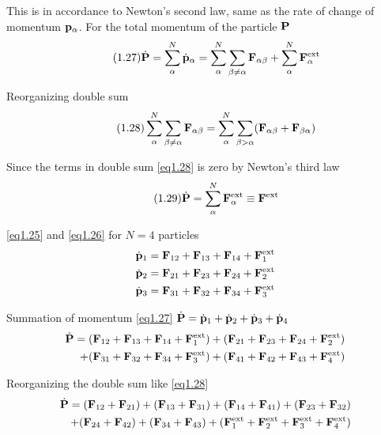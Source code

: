 \documentclass[../problems.tex]{subfiles}
\begin{document}
This is in accordance to Newton's second law, same as the rate of change of momentum 
$\mathbf{p}_\alpha$. For the total momentum of the particle $\mathbf{P}$
\begin{equation} \tag{1.27} \label{eq1.27}
    \dot{\mathbf{P}} = \sum_{\alpha}^N \dot{\mathbf{p}}_\alpha =
    \sum_{\alpha}^N \sum_{\beta \neq \alpha} \mathbf{F}_{\alpha \beta} + 
    \sum_{\alpha}^N \mathbf{F}_{\alpha}^\text{ext}
\end{equation}

Reorganizing double sum
\begin{equation} \tag{1.28} \label{eq1.28}
    \sum_{\alpha}^N \sum_{\beta \neq \alpha} \mathbf{F}_{\alpha \beta} 
    = \sum_{\alpha}^N \sum_{\beta > \alpha} (\mathbf{F}_{\alpha \beta} + \mathbf{F}_{\beta \alpha}) 
\end{equation}
    
Since the terms in double sum \eqref{eq1.28} is zero by Newton's third law
\begin{equation} \tag{1.29} \label{eq1.29}
    \dot{\mathbf{P}} = \sum_{\alpha}^N \mathbf{F}_{\alpha}^\text{ext} \equiv \mathbf{F}^\text{ext}
\end{equation}

\newpage
\eqref{eq1.25} and \eqref{eq1.26} for $N=4$ particles
\begin{align*}
    \dot{\mathbf{p}}_1 &= \mathbf{F}_{12} + \mathbf{F}_{13} + \mathbf{F}_{14} + \mathbf{F}_{1}^\text{ext} \\
    \dot{\mathbf{p}}_2 &= \mathbf{F}_{21} + \mathbf{F}_{23} + \mathbf{F}_{24} + \mathbf{F}_{2}^\text{ext} \\
    \dot{\mathbf{p}}_3 &= \mathbf{F}_{31} + \mathbf{F}_{32} + \mathbf{F}_{34} + \mathbf{F}_{3}^\text{ext} \\
\end{align*}

Summation of momentum \eqref{eq1.27} $\dot{\mathbf{P}} = \dot{\mathbf{p}}_1 + \dot{\mathbf{p}}_2 
+ \dot{\mathbf{p}}_3 + \dot{\mathbf{p}}_4$
\begin{align*}
    \dot{\mathbf{P}} = (\mathbf{F}_{12} + \mathbf{F}_{13} + \mathbf{F}_{14} + \mathbf{F}_{1}^\text{ext}) 
    + (\mathbf{F}_{21} + \mathbf{F}_{23} + \mathbf{F}_{24} + \mathbf{F}_{2}^\text{ext}) \\
    + (\mathbf{F}_{31} + \mathbf{F}_{32} + \mathbf{F}_{34} + \mathbf{F}_{3}^\text{ext}) + (\mathbf{F}_{41} 
    + \mathbf{F}_{42} + \mathbf{F}_{43} + \mathbf{F}_{4}^\text{ext})
\end{align*}

Reorganizing the double sum like \eqref{eq1.28}
\begin{align*}
    \dot{\mathbf{P}} = (\mathbf{F}_{12} + \mathbf{F}_{21}) + (\mathbf{F}_{13} + \mathbf{F}_{31}) 
    + (\mathbf{F}_{14} + \mathbf{F}_{41}) + (\mathbf{F}_{23} + \mathbf{F}_{32}) \\
    + (\mathbf{F}_{24} + \mathbf{F}_{42}) + (\mathbf{F}_{34} + \mathbf{F}_{43}) + (\mathbf{F}_{1}^\text{ext} 
    + \mathbf{F}_{2}^\text{ext} + \mathbf{F}_{3}^\text{ext} + \mathbf{F}_{4}^\text{ext})
\end{align*}
\end{document}
